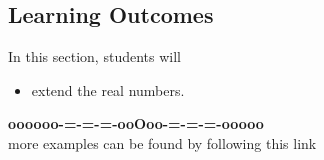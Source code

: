 \documentclass{ximera}
\begin{document}
\subsection*{Learning Outcomes}



\begin{sectionOutcomes}
In this section, students will 

\begin{itemize}
\item extend the real numbers.
\end{itemize}
\end{sectionOutcomes}










\begin{center}
\textbf{\textcolor{green!50!black}{oooooo-=-=-=-ooOoo-=-=-=-ooooo}} \\

more examples can be found by following this link\\ 

\end{center}
\end{document}
